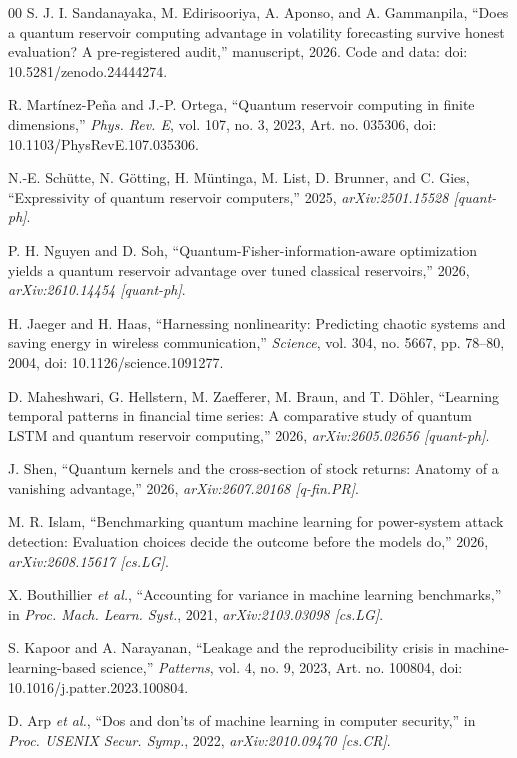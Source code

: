 \documentclass{ieeeaccess}
\begin{document}
\begin{thebibliography}{00}
S. J. I. Sandanayaka, M. Edirisooriya, A. Aponso, and A. Gammanpila, ``Does a quantum reservoir computing advantage in volatility forecasting survive honest evaluation? A pre-registered audit,'' manuscript, 2026. Code and data: doi: 10.5281/zenodo.24444274.

R. Mart\'inez-Pe\~na and J.-P. Ortega, ``Quantum reservoir computing in finite dimensions,'' \emph{Phys. Rev. E}, vol. 107, no. 3, 2023, Art. no. 035306, doi: 10.1103/PhysRevE.107.035306.

N.-E. Sch\"utte, N. G\"otting, H. M\"untinga, M. List, D. Brunner, and C. Gies, ``Expressivity of quantum reservoir computers,'' 2025, \emph{arXiv:2501.15528 [quant-ph]}.

P. H. Nguyen and D. Soh, ``Quantum-Fisher-information-aware optimization yields a quantum reservoir advantage over tuned classical reservoirs,'' 2026, \emph{arXiv:2610.14454 [quant-ph]}.

H. Jaeger and H. Haas, ``Harnessing nonlinearity: Predicting chaotic systems and saving energy in wireless communication,'' \emph{Science}, vol. 304, no. 5667, pp. 78--80, 2004, doi: 10.1126/science.1091277.

D. Maheshwari, G. Hellstern, M. Zaefferer, M. Braun, and T. D\"ohler, ``Learning temporal patterns in financial time series: A comparative study of quantum LSTM and quantum reservoir computing,'' 2026, \emph{arXiv:2605.02656 [quant-ph]}.

J. Shen, ``Quantum kernels and the cross-section of stock returns: Anatomy of a vanishing advantage,'' 2026, \emph{arXiv:2607.20168 [q-fin.PR]}.

M. R. Islam, ``Benchmarking quantum machine learning for power-system attack detection: Evaluation choices decide the outcome before the models do,'' 2026, \emph{arXiv:2608.15617 [cs.LG]}.

X. Bouthillier \emph{et al.}, ``Accounting for variance in machine learning benchmarks,'' in \emph{Proc. Mach. Learn. Syst.}, 2021, \emph{arXiv:2103.03098 [cs.LG]}.

S. Kapoor and A. Narayanan, ``Leakage and the reproducibility crisis in machine-learning-based science,'' \emph{Patterns}, vol. 4, no. 9, 2023, Art. no. 100804, doi: 10.1016/j.patter.2023.100804.

D. Arp \emph{et al.}, ``Dos and don'ts of machine learning in computer security,'' in \emph{Proc. USENIX Secur. Symp.}, 2022, \emph{arXiv:2010.09470 [cs.CR]}.


\end{thebibliography}
\end{document}

